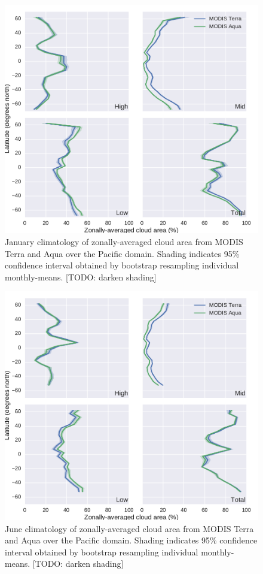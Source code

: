 \begin{figure}[htbp]
\centering
\includegraphics{graphics/misr_cldmodis_zonal_2008-01.pdf}
\caption{\label{fig:misr_cldmodis_zonal_january}January climatology of
zonally-averaged cloud area from MODIS Terra and Aqua over the Pacific
domain. Shading indicates 95\% confidence interval obtained by bootstrap
resampling individual monthly-means. {[}TODO: darken
shading{]}}\label{fig:misrux5fcldmodisux5fzonalux5fjanuary}
\end{figure}

\begin{figure}[htbp]
\centering
\includegraphics{graphics/misr_cldmodis_zonal_2008-06.pdf}
\caption{\label{fig:misr_cldmodis_zonal_june}June climatology of
zonally-averaged cloud area from MODIS Terra and Aqua over the Pacific
domain. Shading indicates 95\% confidence interval obtained by bootstrap
resampling individual monthly-means. {[}TODO: darken
shading{]}}\label{fig:misrux5fcldmodisux5fzonalux5fjune}
\end{figure}

